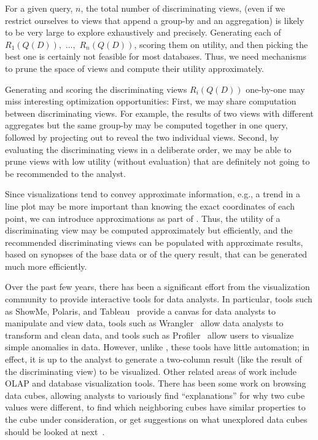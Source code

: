 \begin{denselist}

\item For a given query, $n$, the total number of discriminating views, (even if
we restrict ourselves to views that append a group-by and an aggregation) is
likely to be very large to explore exhaustively and precisely. Generating each
of $R_1(Q(D)),$  $\ldots,$ $R_n(Q(D))$, scoring them on utility, and then
picking the best one is certainly not feasible for most databases. Thus, we need
mechanisms to prune the space of views and compute their utility approximately.

\item Generating and scoring the discriminating views $R_i(Q(D))$ one-by-one may
miss interesting optimization opportunities: First, we may share computation
between discriminating views.  For example, the results of two views with
different aggregates but the same group-by may be computed together in one
query, followed by projecting out to reveal the two individual views.  Second,
by evaluating the discriminating views in a deliberate order, we may be able to
prune views with low utility (without evaluation) that are definitely not going
to be recommended to the analyst.

\item Since visualizations tend to convey approximate information, e.g., a trend
in a line plot may be more important than knowing the exact coordinates of each
point, we can introduce approximations as part of \SeeDB.  Thus, the utility of
a discriminating view may be computed approximately but efficiently, and the
recommended discriminating views can be populated with approximate results,
based on synopses of the base data or of the query result, that can be generated
much more efficiently.

\end{denselist}

Over the past few years, there has been a significant
effort from the visualization community to provide interactive tools
for data analysts. In particular, tools such as ShowMe, Polaris, and
Tableau~\cite{DBLP:journals/cacm/StolteTH08,
  DBLP:journals/tvcg/MackinlayHS07} provide a canvas for data analysts
to manipulate and view data, tools such as
Wrangler~\cite{DBLP:conf/chi/KandelPHH11} allow data analysts to
transform and clean data, and tools such as
Profiler~\cite{DBLP:conf/avi/KandelPPHH12} allow users to visualize
simple anomalies in data.  However, unlike \SeeDB, these tools have
little automation; in effect, it is up to the analyst to generate a
two-column result (like the result of the discriminating view)
to be visualized. Other related areas of work include OLAP and database
visualization tools. There has been some work on browsing data cubes, allowing
analysts to variously find ``explanations'' for why two cube values were
different, to find which neighboring cubes have similar properties to the cube
under consideration, or get suggestions on what unexplored data cubes should be
looked at next~\cite{DBLP:conf/vldb/Sarawagi99, DBLP:conf/vldb/SatheS01,
DBLP:conf/vldb/Sarawagi00}.


